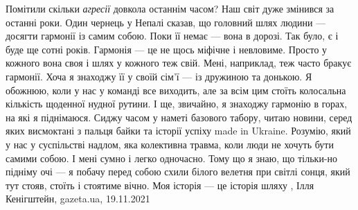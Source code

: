 Помітили скільки \emph{агресії} довкола останнім часом?  Наш світ дуже змінився
за останні роки. Один чернець у Непалі сказав, що головний шлях людини —
досягти гармонії із самим собою. Поки її немає — вона в дорозі. Так було, є і
буде ще сотні років. Гармонія — це не щось міфічне і невловиме. Просто у
кожного вона своя і шлях у кожного теж свій.  Мені, наприклад, теж часто бракує
гармонії. Хоча я знаходжу її у своїй сім'ї — із дружиною та донькою. Я обожнюю,
коли у нас у команді все виходить, але за всім цим стоїть колосальна кількість
щоденної нудної рутини. І ще, звичайно, я знаходжу гармонію в горах, на які я
піднімаюся.  Сиджу часом у наметі базового табору, читаю новини, серед яких
висмоктані з пальця байки та історії успіху made in Ukraine. Розумію, який у
нас у суспільстві надлом, яка колективна травма, коли люди не хочуть бути
самими собою. І мені сумно і легко одночасно.  Тому що я знаю, що тільки-но
підніму очі — я побачу перед собою схили білого велетня при світлі сонця, який
тут стояв, стоїть і стоятиме вічно.  Моя історія — це історія шляху
, 
Ілля Кенігштейн, gazeta.ua, 19.11.2021
